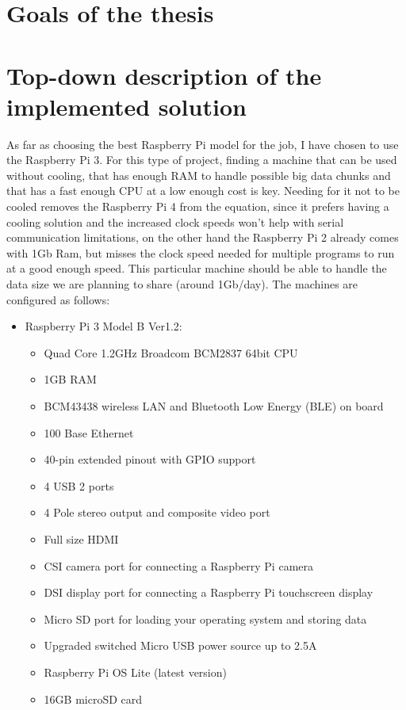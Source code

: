 \documentclass[a4paper, 12pt]{book}
\begin{document}
\section{Goals of the thesis}
\section{Top-down description of the implemented solution}
As far as choosing the best Raspberry Pi model for the job, I have chosen to use the Raspberry Pi 3. For this type of project, finding a machine that can be used without cooling, that has enough RAM to handle possible big data chunks and that has a fast enough CPU at a low enough cost is key. Needing for it not to be cooled removes the Raspberry Pi 4 from the equation, since it prefers having a cooling solution and the increased clock speeds won't help with serial communication limitations, on the other hand the Raspberry Pi 2 already comes with 1Gb Ram, but misses the clock speed needed for multiple programs to run at a good enough speed.
This particular machine should be able to handle the data size we are planning to share (around 1Gb/day). The machines are configured as follows:
\begin{itemize}
    \item Raspberry Pi 3 Model B Ver1.2:
    \begin{itemize}
        \item Quad Core 1.2GHz Broadcom BCM2837 64bit CPU
        \item 1GB RAM
        \item BCM43438 wireless LAN and Bluetooth Low Energy (BLE) on board
        \item 100 Base Ethernet
        \item 40-pin extended pinout with GPIO support
        \item 4 USB 2 ports
        \item 4 Pole stereo output and composite video port
        \item Full size HDMI
        \item CSI camera port for connecting a Raspberry Pi camera
        \item DSI display port for connecting a Raspberry Pi touchscreen display
        \item Micro SD port for loading your operating system and storing data
        \item Upgraded switched Micro USB power source up to 2.5A
        \item Raspberry Pi OS Lite (latest version)
        \item 16GB microSD card
    \end{itemize}
\end{itemize}
\end{document}
